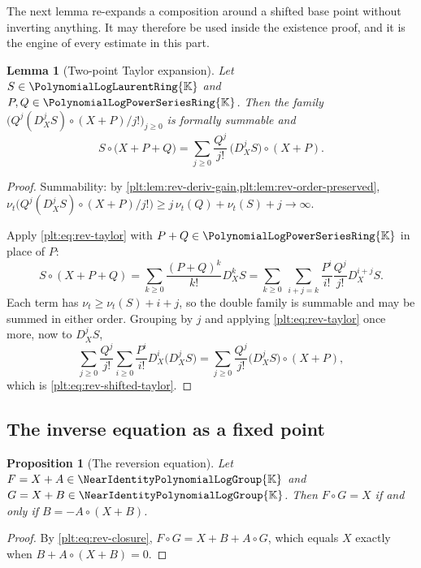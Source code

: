 \documentclass[11pt,oneside]{article}
\theoremstyle{plain}
\newtheorem{proposition}[theorem]{Proposition}
\newtheorem{lemma}[theorem]{Lemma}
\theoremstyle{definition}
\theoremstyle{remark}
\newcommand{\K}{\mathbb{K}}
\newcommand{\PLpow}{\PolynomialLogPowerSeriesRing{\K}}   %
\newcommand{\PLlau}{\PolynomialLogLaurentRing{\K}}       %
\newcommand{\Gnear}{\NearIdentityPolynomialLogGroup{\K}} %
\newcommand{\ordt}{\nu_{t}}                              %
\newcommand{\DX}{D_{X}}                                  %
\newcommand{\compose}{\mathbin{\circ}}
\begin{document}
The next lemma re-expands a composition around a shifted base point without
inverting anything.  It may therefore be used inside the existence proof, and
it is the engine of every estimate in this part.

\begin{lemma}[Two-point Taylor expansion]
\label{plt:lem:rev-shifted-taylor}
Let \(S\in\PLlau\) and \(P,Q\in\PLpow\).  Then the family
\(\bigl(Q^j(\DX^jS)\compose(X+P)/j!\bigr)_{j\ge0}\) is formally summable and
\begin{equation}\label{plt:eq:rev-shifted-taylor}
 S\compose\bigl(X+P+Q\bigr)
 =\sum_{j\ge0}\frac{Q^j}{j!}\,\bigl(\DX^jS\bigr)\compose(X+P).
\end{equation}
\end{lemma}

\begin{proof}
Summability: by \cref{plt:lem:rev-deriv-gain,plt:lem:rev-order-preserved},
\(\ordt\bigl(Q^j(\DX^jS)\compose(X+P)/j!\bigr)\ge j\,\ordt(Q)+\ordt(S)+j
\to\infty\).

Apply \eqref{plt:eq:rev-taylor} with \(P+Q\in\PLpow\) in place of \(P\):
\[
 S\compose(X+P+Q)
 =\sum_{k\ge0}\frac{(P+Q)^k}{k!}\DX^kS
 =\sum_{k\ge0}\ \sum_{i+j=k}\frac{P^i}{i!}\frac{Q^j}{j!}\DX^{i+j}S .
\]
Each term has \(\ordt\ge\ordt(S)+i+j\), so the double family is summable and
may be summed in either order.  Grouping by \(j\) and applying
\eqref{plt:eq:rev-taylor} once more, now to \(\DX^jS\),
\[
 \sum_{j\ge0}\frac{Q^j}{j!}\sum_{i\ge0}\frac{P^i}{i!}\DX^i\bigl(\DX^jS\bigr)
 =\sum_{j\ge0}\frac{Q^j}{j!}\bigl(\DX^jS\bigr)\compose(X+P),
\]
which is \eqref{plt:eq:rev-shifted-taylor}.
\end{proof}

\subsection{The inverse equation as a fixed point}
\label{plt:sec:rev-fixed-point}

\begin{proposition}[The reversion equation]
\label{plt:prop:rev-fixed-point-equation}
Let \(F=X+A\in\Gnear\) and \(G=X+B\in\Gnear\).  Then \(F\compose G=X\) if and
only if \(B=-A\compose(X+B)\).
\end{proposition}

\begin{proof}
By \eqref{plt:eq:rev-closure}, \(F\compose G=X+B+A\compose G\), which equals
\(X\) exactly when \(B+A\compose(X+B)=0\).
\end{proof}
\end{document}
